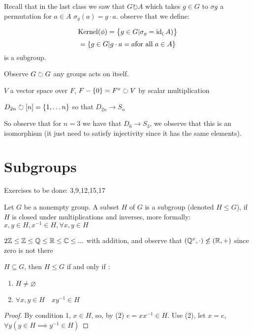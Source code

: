 Recall that in the last class we saw that $ G \circlearrowright A $ which takes $ g \in G$ to $ \sigma g $ a permutation for $a \in A$ $\sigma_g(a) = g \cdot a$. observe that we define:
\begin{define}
	\[ \operatorname{Kernel}(\phi) = \left\lbrace g\in G | \sigma_g = \operatorname{id}_(A)  \right\rbrace \]
	\[ = \left\lbrace g \in G | g \cdot a = a  \textrm{for all } a \in A  \right\rbrace \]
	is a subgroup.
\end{define}

\begin{example}
	Observe $ G \circlearrowright G$ any groups acts on itself.
\end{example}
\begin{example}
	$V$ a vector space over $F$, $ F - \left\lbrace 0 \right\rbrace = F^x \circlearrowright V $ by scalar multiplication
\end{example}
\begin{example}
	$ D_{2n} \circlearrowright [n] = \left\lbrace 1, \ldots n \right\rbrace $ so that $ D_{2n} \rightarrow S_n$
\end{example}
So observe that for $n=3$ we have that $ D_6 \rightarrow S_3 $, we observe that this is an isomorphism (it just need to satisfy injectivity since it has the same elements).

\section[2.1]{Subgroups} Exercises to be done: 3,9,12,15,17
\begin{define}
	Let $G$ be a nonempty group. A subset $H$ of $G$ is a subgroup (denoted $H \leq G$), if $H$ is closed under multiplications and inverses, more formally: $x,y \in H, x^{-1} \in H, \forall x,y \in H$
\end{define}

\begin{example}
	$ 2 \mathbb{Z} \leq \mathbb{Z} \leq \mathbb{Q} \leq \mathbb{R} \leq \mathbb{C} \leq ... $ with addition, and observe that $ (\mathbb{Q}^x, \cdot) \not\leq (\mathbb{R}, +) $ since zero is not there
\end{example}
\begin{prop}
	$H \subseteq G$, then $ H \leq G$ if and only if :
	\begin{enumerate}
		\item $H \neq \varnothing $
		\item $ \forall x,y \in H \quad xy^{-1} \in H $
	\end{enumerate}
\end{prop}
\begin{proof}
	By condition 1, $ x \in H $, so, by (2) $ e = x x^{-1} \in H$. Use (2), let $ x = e$, $ \forall y ( y \in H \implies y^{-1} \in H) $
\end{proof}

